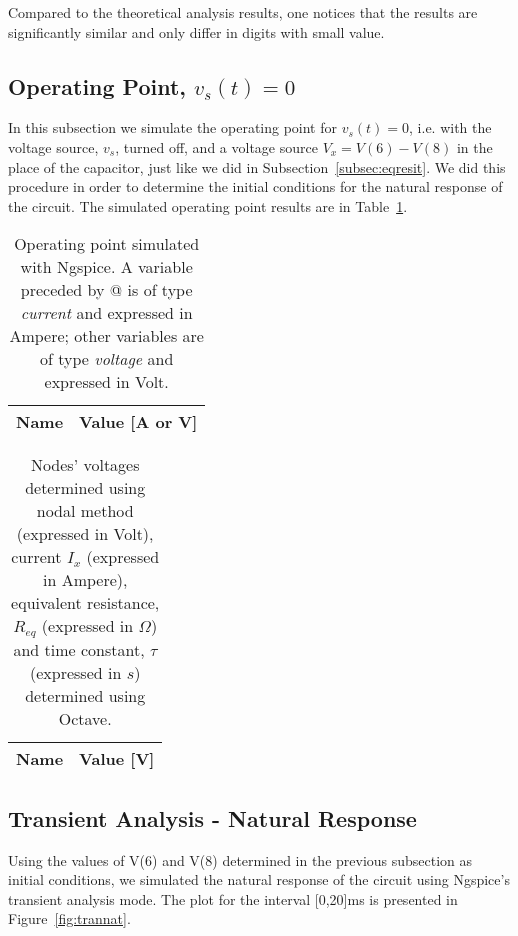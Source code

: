 Compared to the theoretical analysis results, one notices that the results are significantly similar and only differ in digits with small value.

\subsection{Operating Point, $v_s(t)=0$}

In this subsection we simulate the operating point for $v_s(t)=0$, i.e. with the voltage source, $v_s$, turned off, and a voltage source $V_x=V(6)-V(8)$ in the place of the capacitor, just like we did in Subsection~\ref{subsec:eqresit}. We did this procedure in order to determine the initial conditions for the natural response of the circuit. The simulated operating point results are in Table~\ref{tab:op21}.

\vspace{1mm}

\begin{table}[H]
  \centering
  \begin{tabular}{|l|r|}
    \hline    
    {\bf Name} & {\bf Value [A or V]} \\ \hline
    
  \end{tabular}
  \caption{Operating point simulated with Ngspice. A variable preceded by @ is of type {\em current} and expressed in Ampere; other variables are of type {\it voltage} and expressed in Volt.}
  \label{tab:op21}
\end{table}


\begin{table}[H]
  \centering
  \begin{tabular}{|l|r|}
    \hline    
    {\bf Name} & {\bf Value [V]} \\ \hline
    
  \end{tabular}
  \caption{Nodes' voltages determined using nodal method (expressed in Volt), current $I_x$ (expressed in Ampere), equivalent resistance, $R_{eq}$ (expressed in $\Omega$) and time constant, $\tau$ (expressed in $s$) determined using Octave.}
  \label{tab:op22}
\end{table}


\subsection{Transient Analysis - Natural Response} \label{subsec:trannat}

Using the values of V(6) and V(8) determined in the previous subsection as initial conditions, we simulated the natural response of the circuit using Ngspice's transient analysis mode. The plot for the interval [0,20]ms is presented in Figure~\ref{fig:trannat}.

